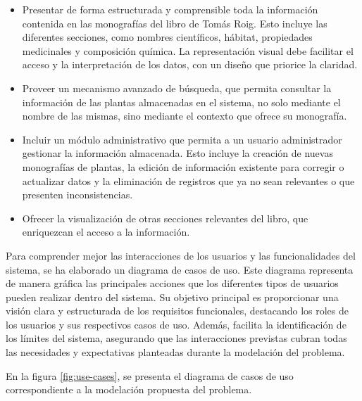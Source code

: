 \begin{itemize}
    \item Presentar de forma estructurada y comprensible toda la información contenida 
    en las monografías del libro de Tomás Roig. Esto incluye las diferentes secciones, 
    como nombres científicos, hábitat, propiedades medicinales y composición química. 
    La representación visual debe facilitar el acceso y la interpretación de los datos, 
    con un diseño que priorice la claridad.
    \item Proveer un mecanismo avanzado de búsqueda, que permita consultar la información
    de las plantas almacenadas en el sistema, no solo mediante el nombre de las mismas, 
    sino mediante el contexto que ofrece su monografía.
    \item Incluir un módulo administrativo que permita a un usuario administrador gestionar
    la información almacenada. Esto incluye la creación de nuevas monografías de plantas, 
    la edición de información existente para corregir o actualizar datos y la eliminación 
    de registros que ya no sean relevantes o que presenten inconsistencias.
    \item Ofrecer la visualización de otras secciones relevantes del libro, que enriquezcan el
    acceso a la información.
\end{itemize}

Para comprender mejor las interacciones de los usuarios y las funcionalidades del sistema, 
se ha elaborado un diagrama de casos de uso. Este diagrama representa de manera gráfica 
las principales acciones que los diferentes tipos de usuarios pueden realizar dentro del sistema. 
Su objetivo principal es proporcionar una visión clara y estructurada de los requisitos funcionales, 
destacando los roles de los usuarios y sus respectivos casos de uso. Además, facilita la 
identificación de los límites del sistema, asegurando que las interacciones previstas cubran 
todas las necesidades y expectativas planteadas durante la modelación del problema.

En la figura \ref{fig:use-cases}, se presenta el diagrama de casos de uso correspondiente a la modelación 
propuesta del problema.

